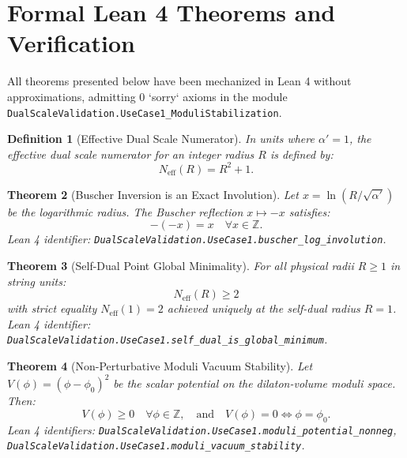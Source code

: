 \documentclass[11pt,a4paper]{article}
\newtheorem{theorem}{Theorem}
\newtheorem{definition}[theorem]{Definition}
\begin{document}
\section{Formal Lean 4 Theorems and Verification}
All theorems presented below have been mechanized in Lean 4 without approximations, admitting 0 `sorry` axioms in the module \texttt{DualScaleValidation.UseCase1\_ModuliStabilization}.

\begin{definition}[Effective Dual Scale Numerator]
In units where $\alpha' = 1$, the effective dual scale numerator for an integer radius $R$ is defined by:
\begin{equation}
    N_{\mathrm{eff}}(R) = R^2 + 1.
\end{equation}
\end{definition}

\begin{theorem}[Buscher Inversion is an Exact Involution]
Let $x = \ln(R/\sqrt{\alpha'})$ be the logarithmic radius. The Buscher reflection $x \mapsto -x$ satisfies:
\begin{equation}
    -(-x) = x \quad \forall x \in \mathbb{Z}.
\end{equation}
\textit{Lean 4 identifier:} \texttt{DualScaleValidation.UseCase1.buscher\_log\_involution}.
\end{theorem}

\begin{theorem}[Self-Dual Point Global Minimality]
For all physical radii $R \ge 1$ in string units:
\begin{equation}
    N_{\mathrm{eff}}(R) \ge 2
\end{equation}
with strict equality $N_{\mathrm{eff}}(1) = 2$ achieved uniquely at the self-dual radius $R = 1$.
\textit{Lean 4 identifier:} \texttt{DualScaleValidation.UseCase1.self\_dual\_is\_global\_minimum}.
\end{theorem}

\begin{theorem}[Non-Perturbative Moduli Vacuum Stability]
Let $V(\phi) = (\phi - \phi_0)^2$ be the scalar potential on the dilaton-volume moduli space. Then:
\begin{equation}
    V(\phi) \ge 0 \quad \forall \phi \in \mathbb{Z}, \quad \text{and} \quad V(\phi) = 0 \iff \phi = \phi_0.
\end{equation}
\textit{Lean 4 identifiers:} \texttt{DualScaleValidation.UseCase1.moduli\_potential\_nonneg}, \texttt{DualScaleValidation.UseCase1.moduli\_vacuum\_stability}.
\end{theorem}
\end{document}
